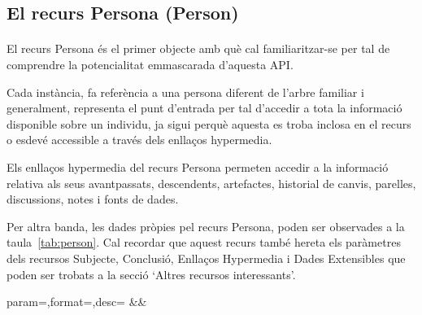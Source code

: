 \subsection{El recurs Persona (Person)}

    \paragraph{}
    El recurs Persona és el primer objecte amb què cal familiaritzar-se per tal de comprendre la potencialitat emmascarada d'aquesta API.

    Cada instància, fa referència a una persona diferent de l'arbre familiar i generalment, representa el punt d'entrada per tal d'accedir a tota la informació disponible sobre un individu, ja sigui perquè aquesta es troba inclosa en el recurs o esdevé accessible a través dels enllaços hypermedia.

    Els enllaços hypermedia del recurs Persona permeten accedir a la informació relativa als seus avantpassats, descendents, artefactes, historial de canvis, parelles, discussions, notes i fonts de dades.

    Per altra banda, les dades pròpies pel recurs Persona, poden ser observades a la taula~\ref{tab:person}. Cal recordar que aquest recurs també hereta els paràmetres dels recursos Subjecte, Conclusió, Enllaços Hypermedia i Dades Extensibles que poden ser trobats a la secció `Altres recursos interessants'.

    \begin{center}
             {param=\param,format=\format,desc=\desc}
             {\param&\format&\desc}
     \end{center}
